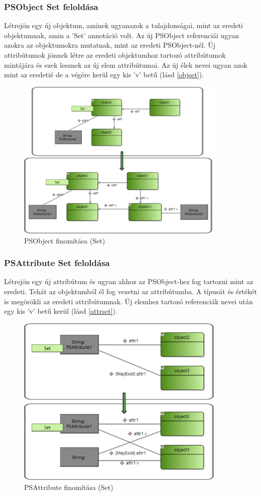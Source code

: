 \subsubsection{PSObject Set feloldása}
Létrejön egy új objektum, aminek ugyanazok a tulajdonságai, mint az eredeti objektumnak, amin a 'Set' annotáció volt. Az új PSObject referenciái ugyan azokra az objektumokra mutatnak, mint az eredeti PSObject-nél. Új attribútumok jönnek létre az eredeti objektumhoz tartozó attribútumok mintájára és ezek lesznek az új elem attribútumai. Az új élek nevei ugyan azok mint az eredetié de a végére kerül egy kis 'v' betű (lásd \autoref{objset}).
\begin{figure}[!ht]
	\centering
	\includegraphics[width=100mm]{figures/objset.pdf}
	\caption{PSObject finomítása (Set)}
	\label{objset} 
\end{figure}

\subsubsection{PSAttribute Set feloldása}
Létrejön egy új attribútum és ugyan ahhoz az PSObject-hez fog tartozni mint az eredeti. Tehát az objektumból él fog vezetni az attribútumba. A típusát és értékét is megörökli az eredeti attribútumnak. Új elemhez tartozó referenciák nevei után egy kis 'v' betű kerül (lásd \autoref{attrset}).
\begin{figure}[!ht]
	\centering
	\includegraphics[width=100mm]{figures/attrset.pdf}
	\caption{PSAttribute finomítása (Set)}
	\label{attrset} 
\end{figure}

